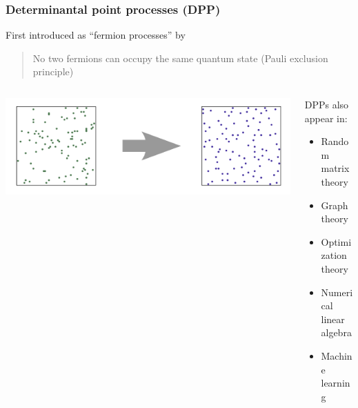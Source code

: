 \documentclass{beamer}
\begin{document}
\begin{frame}
  \frametitle{Determinantal point processes (DPP)}
  First introduced as ``fermion processes'' by \cite{dpp-physics}\\[2mm]\pause
  \begin{quote}
No two fermions can occupy the same quantum state\quad
    \textnormal{\small (Pauli exclusion principle)}
  \end{quote}

  \begin{columns}
\begin{column}{0.5\textwidth}
     \includegraphics[width=\textwidth]{../figs/gue.png}
\end{column}
    \begin{column}{0.5\textwidth}
\pause  DPPs also appear in:\pause
  \begin{itemize}
  \item Random matrix theory \pause
  \item Graph theory \pause
  \item Optimization theory\pause
  \item Numerical linear algebra \pause
  \item Machine learning
  \end{itemize}
\end{column}
\end{columns}
\let\thefootnote\relax{}
\end{frame}
\end{document}
